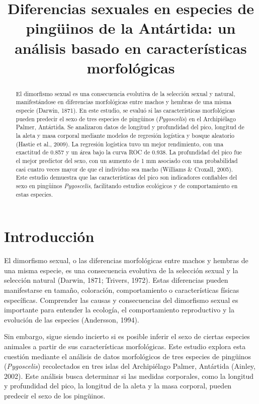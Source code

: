 \documentclass[
]{agujournal2019}
\begin{document}
\title{Diferencias sexuales en especies de pingüinos de la Antártida: un
análisis basado en características morfológicas}



\begin{abstract}
El dimorfismo sexual es una consecuencia evolutiva de la selección
sexual y natural, manifestándose en diferencias morfológicas entre
machos y hembras de una misma especie (Darwin, 1871). En este estudio,
se evaluó si las características morfológicas pueden predecir el sexo de
tres especies de pingüinos (\emph{Pygoscelis}) en el Archipiélago
Palmer, Antártida. Se analizaron datos de longitud y profundidad del
pico, longitud de la aleta y masa corporal mediante modelos de regresión
logística y bosque aleatorio (Hastie et al., 2009). La regresión
logística tuvo un mejor rendimiento, con una exactitud de 0.857 y un
área bajo la curva ROC de 0.938. La profundidad del pico fue el mejor
predictor del sexo, con un aumento de 1 mm asociado con una probabilidad
casi cuatro veces mayor de que el individuo sea macho (Williams \&
Croxall, 2005). Este estudio demuestra que las características del pico
son indicadores confiables del sexo en pingüinos \emph{Pygoscelis},
facilitando estudios ecológicos y de comportamiento en estas especies.
\end{abstract}





\section{Introducción}\label{introducciuxf3n}

El dimorfismo sexual, o las diferencias morfológicas entre machos y
hembras de una misma especie, es una consecuencia evolutiva de la
selección sexual y la selección natural (Darwin, 1871; Trivers, 1972).
Estas diferencias pueden manifestarse en tamaño, coloración,
comportamiento o características físicas específicas. Comprender las
causas y consecuencias del dimorfismo sexual es importante para entender
la ecología, el comportamiento reproductivo y la evolución de las
especies (Andersson, 1994).

Sin embargo, sigue siendo incierto si es posible inferir el sexo de
ciertas especies animales a partir de sus características morfológicas.
Este estudio explora esta cuestión mediante el análisis de datos
morfológicos de tres especies de pingüinos (\emph{Pygoscelis})
recolectados en tres islas del Archipiélago Palmer, Antártida (Ainley,
2002). Este análisis busca determinar si las medidas corporales, como la
longitud y profundidad del pico, la longitud de la aleta y la masa
corporal, pueden predecir el sexo de los pingüinos.
\end{document}
